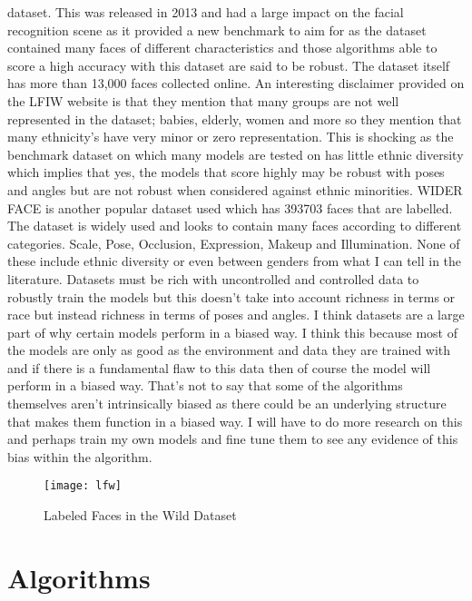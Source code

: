 \documentclass{article}
\begin{document}
\cite{Sagonas2013} dataset. This was released in 2013 and had a large impact on the facial
recognition scene as it provided a new benchmark to aim for as the dataset contained many
faces of different characteristics and those algorithms able to score a high accuracy with this
dataset are said to be robust. The dataset itself has more than 13,000 faces collected online.
An interesting disclaimer provided on the LFIW website is that they mention that many groups
are not well represented in the dataset; babies, elderly, women and more so they mention that
many ethnicity's have very minor or zero representation. This is shocking as the benchmark
dataset on which many models are tested on has little ethnic diversity which implies that yes,
the models that score highly may be robust with poses and angles but are not robust when
considered against ethnic minorities.
WIDER FACE \cite{Yang2016} is another popular dataset used which has 393703 faces that
are labelled. The dataset is widely used and looks to contain many faces according to different
categories. Scale, Pose, Occlusion, Expression, Makeup and Illumination. None of these include
ethnic diversity or even between genders from what I can tell in the literature.
Datasets must be rich with uncontrolled and controlled data to robustly train the models but
this doesn’t take into account richness in terms or race but instead richness in terms of poses
and angles. I think datasets are a large part of why certain models perform in a biased way. I
think this because most of the models are only as good as the environment and data they are
trained with and if there is a fundamental flaw to this data then of course the model will
perform in a biased way. That’s not to say that some of the algorithms themselves aren’t
intrinsically biased as there could be an underlying structure that makes them function in a
biased way. I will have to do more research on this and perhaps train my own models and fine
tune them to see any evidence of this bias within the algorithm.
\begin{figure}[h!]
\centering
\texttt{[image: lfw]}
\caption{Labeled Faces in the Wild Dataset}
\label{fig:lfw}
\end{figure}
\section{Algorithms}
\end{document}
